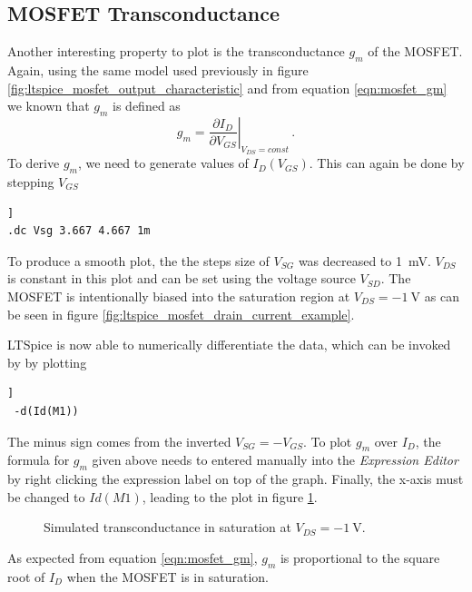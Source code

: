 \documentclass[12pt]{book}
\begin{document}
\subsection{MOSFET Transconductance}
Another interesting property to plot is the transconductance $g_m$ of the MOSFET. Again, using the same model used previously in figure \ref{fig:ltspice_mosfet_output_characteristic} and from equation \ref{eqn:mosfet_gm} we known that $g_m$ is defined as
\begin{equation*}
    g_{m} = \left. \frac{\partial I_{D}}{\partial V_{GS}} \right|_{V_{DS} = const} \,.
\end{equation*}
To derive $g_m$, we need to generate values of $I_D(V_{GS})$. This can again be done by stepping $V_{GS}$
\begin{lstlisting}[frame=single, xleftmargin=5mm, xrightmargin=5mm, columns=fullflexible, morekeywords={model, dc}, keywordstyle=\bfseries, basicstyle=\rmfamily]]
.dc Vsg 3.667 4.667 1m
\end{lstlisting}
To produce a smooth plot, the the steps size of $V_{SG}$ was decreased to \qty{1}{\mV}. $V_{DS}$ is constant in this plot and can be set using the voltage source $V_{SD}$. The MOSFET is intentionally biased into the saturation region at $V_{DS} = \qty{-1}{\V}$ as can be seen in figure \ref{fig:ltspice_mosfet_drain_current_example}.

LTSpice is now able to numerically differentiate the data, which can be invoked by by plotting
\begin{lstlisting}[frame=single, xleftmargin=5mm, xrightmargin=5mm, columns=fullflexible, morekeywords={model, dc}, keywordstyle=\bfseries, basicstyle=\rmfamily]]
 -d(Id(M1))
\end{lstlisting}

The minus sign comes from the inverted $V_{SG} = -V_{GS}$. To plot $g_m$ over $I_D$, the formula for $g_m$ given above needs to entered manually into the \textit{Expression Editor} by right clicking the expression label on top of the graph. Finally, the x-axis must be changed to $Id(M1)$, leading to the plot in figure \ref{fig:ltspice_mosfet_gm_example}.

\begin{figure}[hb]
    \centering
    
    \caption{Simulated transconductance in saturation at $V_{DS} = \qty{-1}{\V}$.}
    \label{fig:ltspice_mosfet_gm_example}
\end{figure}

As expected from equation \ref{eqn:mosfet_gm}, $g_m$ is proportional to the square root of $I_D$ when the MOSFET is in saturation.
\end{document}
